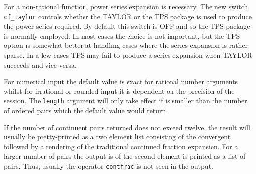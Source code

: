 \hypertarget{switch:CF_TAYLOR}{}

For a non-rational function, power series expansion is necessary. The new
switch \texttt{cf\_taylor} controls whether the TAYLOR or the TPS package is 
used to produce the power series required. By default this switch is OFF and
so the TPS package is normally employed.
In most cases the choice is not important, but the TPS option is somewhat
better at handling cases where the series expansion is rather sparse.
In a few cases TPS may fail to produce a series expansion when TAYLOR succeeds
and vice-versa.

For numerical input the default value is exact for
rational number arguments whilst for irrational or rounded input it is
dependent on the precision of the session. The
\texttt{length} argument will only take effect if is smaller
than the number of ordered pairs which the default value would return.

If the number of continuent pairs returned does not exceed
twelve, the result will usually be pretty-printed as a two element list
consisting of the convergent followed by a rendering of the traditional
continued fraction expansion. For a larger number of pairs the output is
of the second element is printed as a list of pairs. Thus, usually the
operator \texttt{contfrac} is not seen in the output.

